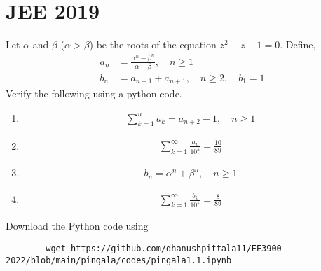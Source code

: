\documentclass[journal,12pt,twocolumn]{IEEEtran}
\renewcommand\thesection{\arabic{section}}
\begin{document}
	\section{JEE 2019}
	\noindent Let $\alpha$ and $\beta$ ($\alpha > \beta$) be the roots of the
	equation $z^2 - z - 1 = 0$. Define,
	\begin{align}
		a_n &= \frac{\alpha^{n}-\beta^{n}}{\alpha - \beta}, \quad n \ge 1
		\\
		b_n &= a_{n-1} + a_{n+1}, \quad n \ge 2, \quad b_1 =1
		\label{eq:10-orig-diff}
	\end{align}
	Verify the following using a python code.
	\begin{enumerate}[label=\thesection.\arabic*
		,ref=\thesection.\theenumi]
		\item 
		\begin{align}
			\sum_{k=1}^{n}a_k = a_{n+2}-1, \quad n \ge 1
		\end{align}
		\item 
		\begin{align}
			\sum_{k=1}^{\infty}\frac{a_k}{10^k} =\frac{10}{89}
		\end{align}
		\item 
		\begin{align}
			b_n =\alpha^n + \beta^n, \quad n \ge 1
		\end{align}
		\item 
		\begin{align}
			\sum_{k=1}^{\infty}\frac{b_k}{10^k} =\frac{8}{89}
		\end{align}
	\end{enumerate}
	Download the Python code using
	\begin{lstlisting}
		wget https://github.com/dhanushpittala11/EE3900-2022/blob/main/pingala/codes/pingala1.1.ipynb
	\end{lstlisting}
\end{document}
